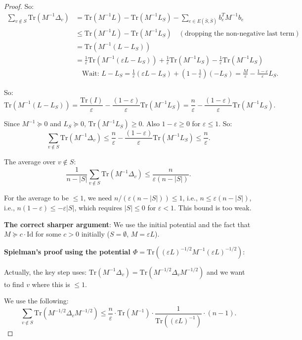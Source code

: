 \documentclass[12pt]{article}
\theoremstyle{definition}
\begin{document}
\begin{proof}
So:
\begin{align*}
\sum_{v\notin S}\mathrm{Tr}(M^{-1}\Delta_v) &= \mathrm{Tr}(M^{-1}L) - \mathrm{Tr}(M^{-1}L_S) - \sum_{e\in E(\bar S,\bar S)}b_e^T M^{-1}b_e \\
&\leq \mathrm{Tr}(M^{-1}L) - \mathrm{Tr}(M^{-1}L_S) \quad (\text{dropping the non-negative last term}) \\
&= \mathrm{Tr}(M^{-1}(L - L_S)) \\
&= \frac{1}{\varepsilon}\mathrm{Tr}(M^{-1}(\varepsilon L - L_S)) + \frac{1}{\varepsilon}\mathrm{Tr}(M^{-1}L_S) - \frac{1}{\varepsilon}\mathrm{Tr}(M^{-1}L_S) \\
&\quad\text{Wait: }L - L_S = \frac{1}{\varepsilon}(\varepsilon L - L_S) + (1 - \frac{1}{\varepsilon})(-L_S) = \frac{M}{\varepsilon} - \frac{1-\varepsilon}{\varepsilon}L_S.
\end{align*}

So:
$$\mathrm{Tr}(M^{-1}(L-L_S)) = \frac{\mathrm{Tr}(I)}{\varepsilon} - \frac{(1-\varepsilon)}{\varepsilon}\mathrm{Tr}(M^{-1}L_S) = \frac{n}{\varepsilon} - \frac{(1-\varepsilon)}{\varepsilon}\mathrm{Tr}(M^{-1}L_S).$$

Since $M^{-1}\succeq 0$ and $L_S\succeq 0$, $\mathrm{Tr}(M^{-1}L_S)\geq 0$. Also $1-\varepsilon\geq 0$ for $\varepsilon\leq 1$. So:
$$\sum_{v\notin S}\mathrm{Tr}(M^{-1}\Delta_v) \leq \frac{n}{\varepsilon} - \frac{(1-\varepsilon)}{\varepsilon}\mathrm{Tr}(M^{-1}L_S) \leq \frac{n}{\varepsilon}.$$

The average over $v\notin S$:
$$\frac{1}{n-|S|}\sum_{v\notin S}\mathrm{Tr}(M^{-1}\Delta_v) \leq \frac{n}{\varepsilon(n-|S|)}.$$

For the average to be $\leq 1$, we need $n/(\varepsilon(n-|S|))\leq 1$, i.e., $n \leq \varepsilon(n-|S|)$, i.e., $n(1-\varepsilon)\leq -\varepsilon|S|$, which requires $|S| \leq 0$ for $\varepsilon < 1$. This bound is too weak.

\textbf{The correct sharper argument}: We use the initial potential and the fact that $M \succeq c\cdot\mathrm{Id}$ for some $c > 0$ initially ($S = \emptyset$, $M = \varepsilon L$).

\textbf{Spielman's proof using the potential $\Phi = \mathrm{Tr}((\varepsilon L)^{-1/2}M^{-1}(\varepsilon L)^{-1/2})$}:

Actually, the key step uses: $\mathrm{Tr}(M^{-1}\Delta_v) = \mathrm{Tr}(M^{-1/2}\Delta_v M^{-1/2})$ and we want to find $v$ where this is $\leq 1$.

We use the following:
$$\sum_{v\notin S}\mathrm{Tr}(M^{-1/2}\Delta_v M^{-1/2}) \leq \frac{n}{\varepsilon}\cdot\mathrm{Tr}(M^{-1})\cdot\frac{1}{\mathrm{Tr}((\varepsilon L)^{-1})}\cdot(n-1).$$


\end{proof}
\end{document}
